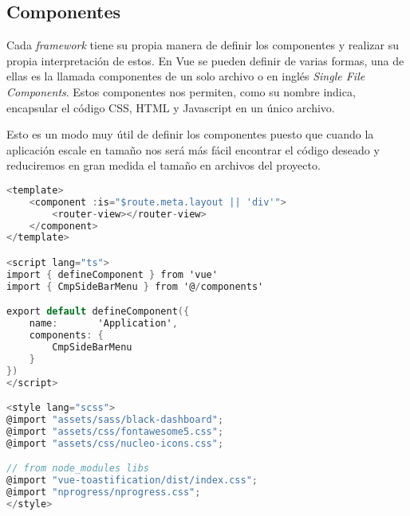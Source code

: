 \subsection{Componentes}
Cada \textit{framework} tiene su propia manera de definir los componentes y realizar su propia interpretación de estos. En Vue se pueden definir de varias formas, una de ellas  es la llamada componentes de un solo archivo o en inglés \textit{Single File Components}. Estos componentes nos permiten, como su nombre indica, encapsular el código CSS, HTML y Javascript en un único archivo.

Esto es un modo muy útil de definir los componentes puesto que cuando la aplicación escale en tamaño nos será más fácil encontrar el código deseado y reduciremos en gran medida el tamaño en archivos del proyecto.

\begin{lstlisting}[language=C,caption={Código del archivo App.vue}, label={lst:app}]
<template>
    <component :is="$route.meta.layout || 'div'">
        <router-view></router-view>
    </component>
</template>

<script lang="ts">
import { defineComponent } from 'vue'
import { CmpSideBarMenu } from '@/components'

export default defineComponent({
    name:       'Application',
    components: {
        CmpSideBarMenu
    }
})
</script>

<style lang="scss">
@import "assets/sass/black-dashboard";
@import "assets/css/fontawesome5.css";
@import "assets/css/nucleo-icons.css";

// from node_modules libs
@import "vue-toastification/dist/index.css";
@import "nprogress/nprogress.css";
</style>
\end{lstlisting}


